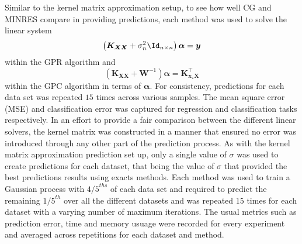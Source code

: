 Similar to the kernel matrix approximation setup, to see how well CG and MINRES compare in providing predictions, each method was used to solve the linear system
\begin{equation*}
    \left( \bm{K_{XX}} + \sigma_n^2 \Id_{n \times n} \right) \bm{\alpha} = \bm{y}
\end{equation*}
within the GPR algorithm and
\begin{equation*}
    \left( \bm{K}_{\bm{X} \bm{X}} + \bm{W}^{-1} \right) \bm{\alpha} = \bm{K}_{\bm{x}_{\star} \bm{X}}^{\intercal}
\end{equation*}
within the GPC algorithm in terms of $\bm{\alpha}$. For consistency, predictions for each data set was repeated $15$ times across various samples. The mean square error (MSE) and classification error was captured for regression and classification tasks respectively. In an effort to provide a fair comparison between the different linear solvers, the kernel matrix was constructed in a manner that ensured no error was introduced through any other part of the prediction process. As with the kernel matrix approximation prediction set up, only a single value of $\sigma$ was used to create predictions for each dataset, that being the value of $\sigma$ that provided the best predictions results using exacts methods. Each method was used to train a Gaussian process with ${4/5}^{ths}$ of each data set and required to predict the remaining ${1/5}^{th}$ over all the different datasets and was repeated $15$ times for each dataset with a varying number of maximum iterations. The usual metrics such as prediction error, time and memory usuage were recorded for every experiment and averaged across repetitions for each dataset and method.